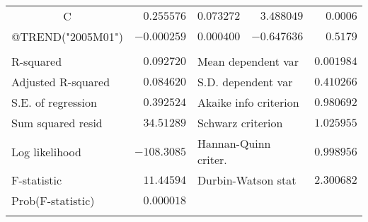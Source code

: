 \begin{tabular}{lrrrr}
\multicolumn{1}{c}{C}&\multicolumn{1}{r}{$0.255576$}&\multicolumn{1}{r}{$0.073272$}&\multicolumn{1}{r}{$3.488049$}&\multicolumn{1}{r}{$0.0006$}\\
\multicolumn{1}{c}{@TREND("2005M01")}&\multicolumn{1}{r}{$-0.000259$}&\multicolumn{1}{r}{$0.000400$}&\multicolumn{1}{r}{$-0.647636$}&\multicolumn{1}{r}{$0.5179$}\\
[4.5pt] \hline \\ [-4.5pt]
\multicolumn{1}{l}{R-squared}&\multicolumn{1}{r}{$0.092720$}&\multicolumn{2}{l}{Mean dependent var}&\multicolumn{1}{r}{$0.001984$}\\
\multicolumn{1}{l}{Adjusted R-squared}&\multicolumn{1}{r}{$0.084620$}&\multicolumn{2}{l}{S.D. dependent var}&\multicolumn{1}{r}{$0.410266$}\\
\multicolumn{1}{l}{S.E. of regression}&\multicolumn{1}{r}{$0.392524$}&\multicolumn{2}{l}{Akaike info criterion}&\multicolumn{1}{r}{$0.980692$}\\
\multicolumn{1}{l}{Sum squared resid}&\multicolumn{1}{r}{$34.51289$}&\multicolumn{2}{l}{Schwarz criterion}&\multicolumn{1}{r}{$1.025955$}\\
\multicolumn{1}{l}{Log likelihood}&\multicolumn{1}{r}{$-108.3085$}&\multicolumn{2}{l}{Hannan-Quinn criter.}&\multicolumn{1}{r}{$0.998956$}\\
\multicolumn{1}{l}{F-statistic}&\multicolumn{1}{r}{$11.44594$}&\multicolumn{2}{l}{Durbin-Watson stat}&\multicolumn{1}{r}{$2.300682$}\\
\multicolumn{1}{l}{Prob(F-statistic)}&\multicolumn{1}{r}{$0.000018$}&\multicolumn{1}{c}{}&\multicolumn{1}{c}{}&\multicolumn{1}{c}{}\\
[4.5pt] \hline \\ [-4.5pt]
\end{tabular}